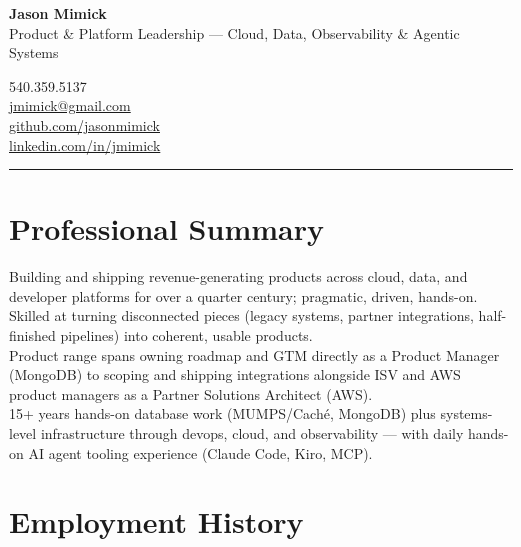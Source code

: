 \documentclass[10pt,letterpaper]{article}
\begin{document}
\noindent
\begin{minipage}[t]{0.62\textwidth}
{\fontsize{20}{24}\selectfont\bfseries\color{accent} Jason Mimick}\\[2pt]
{\normalsize\color{lighttext} Product \& Platform Leadership --- Cloud, Data, Observability \& Agentic Systems}
\end{minipage}%
\hfill
\begin{minipage}[t]{0.36\textwidth}
\raggedleft
{\small\color{lighttext}
540.359.5137\\
\href{mailto:jmimick@gmail.com}{jmimick@gmail.com}\\
\href{https://github.com/jasonmimick}{github.com/jasonmimick}\\
\href{https://www.linkedin.com/in/jmimick}{linkedin.com/in/jmimick}}
\end{minipage}

\vspace{2pt}
{\color{ruleline}\hrule}

\section{Professional Summary}
{\small
Building and shipping revenue-generating products across cloud, data, and developer platforms for over a quarter century; pragmatic, driven, hands-on.\\
Skilled at turning disconnected pieces (legacy systems, partner integrations, half-finished pipelines) into coherent, usable products.\\
Product range spans owning roadmap and GTM directly as a Product Manager (MongoDB) to scoping and shipping integrations alongside ISV and AWS product managers as a Partner Solutions Architect (AWS).\\
15+ years hands-on database work (MUMPS/Cach\'e, MongoDB) plus systems-level infrastructure through devops, cloud, and observability --- with daily hands-on AI agent tooling experience (Claude Code, Kiro, MCP).}

\section{Employment History}
\end{document}
